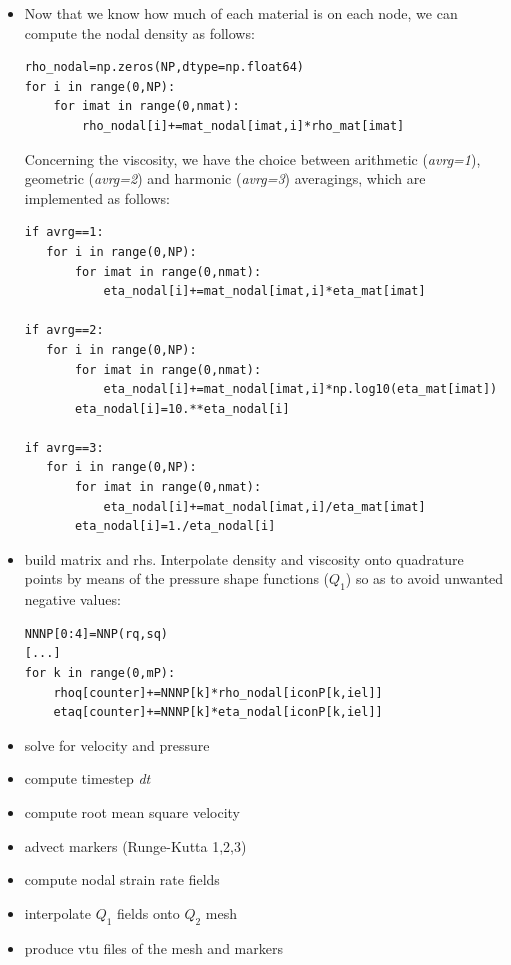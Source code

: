 \begin{itemize}
\item Now that we know how much of each material is on each node, we can compute the nodal density as follows:

\begin{lstlisting}
rho_nodal=np.zeros(NP,dtype=np.float64)
for i in range(0,NP):
    for imat in range(0,nmat):
        rho_nodal[i]+=mat_nodal[imat,i]*rho_mat[imat]
\end{lstlisting}

Concerning the viscosity, we have the choice between arithmetic ({\sl avrg=1}), geometric ({\sl avrg=2}) and 
harmonic ({\sl avrg=3}) averagings, which are implemented as follows:

\begin{lstlisting}
if avrg==1:
   for i in range(0,NP):
       for imat in range(0,nmat):
           eta_nodal[i]+=mat_nodal[imat,i]*eta_mat[imat]

if avrg==2:
   for i in range(0,NP):
       for imat in range(0,nmat):
           eta_nodal[i]+=mat_nodal[imat,i]*np.log10(eta_mat[imat])
       eta_nodal[i]=10.**eta_nodal[i]

if avrg==3:
   for i in range(0,NP):
       for imat in range(0,nmat):
           eta_nodal[i]+=mat_nodal[imat,i]/eta_mat[imat]
       eta_nodal[i]=1./eta_nodal[i]
\end{lstlisting}

\item build matrix and rhs. Interpolate density and viscosity onto quadrature points by means of the pressure 
shape functions ($Q_1$) so as to avoid unwanted negative values:

\begin{lstlisting}
NNNP[0:4]=NNP(rq,sq)
[...]
for k in range(0,mP):
    rhoq[counter]+=NNNP[k]*rho_nodal[iconP[k,iel]]
    etaq[counter]+=NNNP[k]*eta_nodal[iconP[k,iel]]
\end{lstlisting}

\item solve for velocity and pressure
\item compute timestep {\sl dt}
\item compute root mean square velocity
\item advect markers (Runge-Kutta 1,2,3)
\item compute nodal strain rate fields
\item interpolate $Q_1$ fields onto $Q_2$ mesh
\item produce vtu files of the mesh and markers
\end{itemize}



